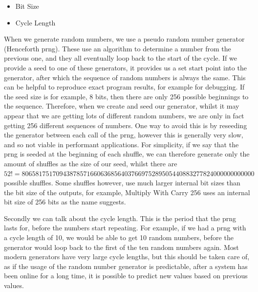 \begin{itemize}
\item Bit Size
\item Cycle Length
\end{itemize}

When we generate random numbers, we use a pseudo random number generator
(Henceforth prng). These
use an algorithm to determine a number from the previous one, and they all
eventually loop back to the start of the cycle. If we provide a seed to one
of these generators, it provides us a set start point into the generator, after
which the sequence of random numbers is always the same. This can be helpful
to reproduce exact program results, for example for debugging. If the seed
size is for example, 8 bits, then there are only 256 possible beginnings to
the sequence. Therefore, when we create and seed our generator, whilst it may
appear that we are getting lots of different random numbers, we are only
in fact getting 256 different sequences of numbers. One way to avoid this is
by reseeding the generator between each call of the prng, however this is
generally very slow, and so not viable in performant applications. For
simplicity, if we say that the prng is seeded at the beginning of each shuffle,
we can therefore generate only the amount of shuffles as the size of our seed,
whilst there are
$52! = 80658175170943878571660636856403766975289505440883277824000000000000$
possible shuffles. Some shuffles however, use much larger internal bit sizes than
the bit size of the outputs, for example, Multiply With Carry 256 \parencite{marsaglia2003}
uses an internal bit size of 256 bits as the name suggests.

Secondly we can talk about the cycle length. This is the period that the prng
lasts for, before the numbers start repeating. For example, if we had a prng
with a cycle length of 10, we would be able to get 10 random numbers, before
the generator would loop back to the first of the ten random numbers again.
Most modern generators have very large cycle lengths, but this should be taken
care of, as if the usage of the random number generator is predictable, after
a system has been online for a long time, it is possible to predict new values
based on previous values.

